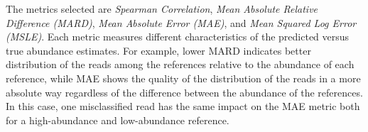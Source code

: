 The metrics selected are \emph{Spearman Correlation}, \emph{Mean Absolute
Relative Difference (MARD)}, \emph{Mean Absolute Error (MAE)}, and
\emph{Mean Squared Log Error (MSLE)}. Each metric measures different
characteristics of the predicted versus true abundance estimates. For example,
lower MARD indicates better distribution of the reads among the
references relative to the abundance of each reference, while MAE shows
the quality of the distribution of the reads in a more absolute way
regardless of the difference between the abundance of the references. In
this case, one misclassified read has the same impact on the MAE metric
both for a high-abundance and low-abundance reference.

\begin{table}[h!]
    \centering
\end{table}

